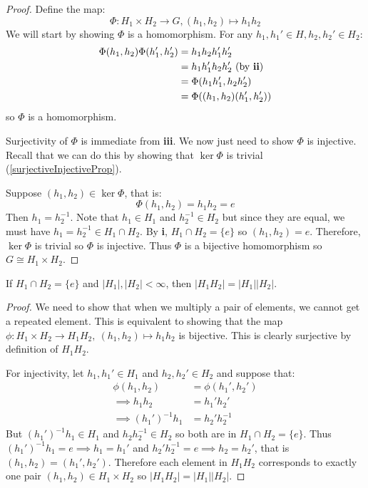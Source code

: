 \documentclass[../main.tex]{subfiles}
\begin{document}
\begin{proof}
  Define the map:
  \[
    \Phi: H_1 \times H_2 \to G, (h_1, h_2) \mapsto h_1h_2
  \]
  We will start by showing $\Phi$ is a homomorphism.
  For any $h_1, h_1' \in H, h_2, h_2' \in H_2$:
  \begin{align*}
    \Phi(h_1, h_2)\Phi(h_1', h_2') &= h_1 h_2 h_1' h_2' \\
                                   &= h_1 h_1' h_2 h_2' \text{ (by \textbf{ii})}\\
                                   &= \Phi(h_1h_1', h_2h_2') \\
                                   &= \Phi((h_1, h_2)(h_1', h_2'))
  \end{align*}
  so $\Phi$ is a homomorphism.

  Surjectivity of $\Phi$ is immediate from \textbf{iii}.
  We now just need to show $\Phi$ is injective.
  Recall that we can do this by showing that $\ker \Phi$ is trivial (\cref{surjectiveInjectiveProp}).

  Suppose $(h_1, h_2) \in \ker \Phi$, that is:
  \[
    \Phi(h_1, h_2) = h_1 h_2 = e
  \]
  Then $h_1 = h^{-1}_{2}$.
  Note that $h_1 \in H_1$ and $h^{-1}_{2} \in H_2$ but since they are equal, we must have $h_1 = h^{-1}_{2} \in H_1 \cap H_2$.
  By \textbf{i}, $H_1 \cap H_2 = \{e\}$ so $(h_1, h_2) = e$.
  Therefore, $\ker \Phi$ is trivial so $\Phi$ is injective.
  Thus $\Phi$ is a bijective homomorphism so $G \cong H_1 \times H_2$.
\end{proof}
\begin{lemma}
  If $H_1 \cap H_2 = \{e\}$ and $|H_1|, |H_2| < \infty$, then $|H_1 H_2| = |H_1||H_2|$.
\end{lemma}
\begin{proof}
  We need to show that when we multiply a pair of elements, we cannot get a repeated element.
  This is equivalent to showing that the map $\phi: H_1 \times H_2 \to H_1 H_2,\ (h_1, h_2) \mapsto h_1 h_2$ is bijective.
  This is clearly surjective by definition of $H_1H_2$.

  For injectivity, let $h_1, h_1' \in H_1$ and $h_2, h_2' \in H_2$ and suppose that:
  \begin{align*}
    \phi(h_1, h_2) &= \phi(h_1', h_2') \\
    \implies h_1 h_2 &= h_1' h_2' \\
    \implies (h_1')^{-1} h_1 &= h_2'h^{-1}_{2}
  \end{align*}
  But $(h_1')^{-1} h_1 \in H_1$ and $h_2h^{-1}_{2} \in H_2$ so both are in $H_1 \cap H_2 = \{e\}$.
  Thus $(h_1')^{-1} h_1 = e \implies h_1 = h_1'$ and $h_2' h^{-1}_{2} = e \implies h_2 = h_2'$, that is $(h_1, h_2) = (h_1', h_2')$.
  Therefore each element in $H_1 H_2$ corresponds to exactly one pair $(h_1, h_2) \in H_1 \times H_2$ so $|H_1H_2| = |H_1||H_2|$.
\end{proof}
\end{document}

